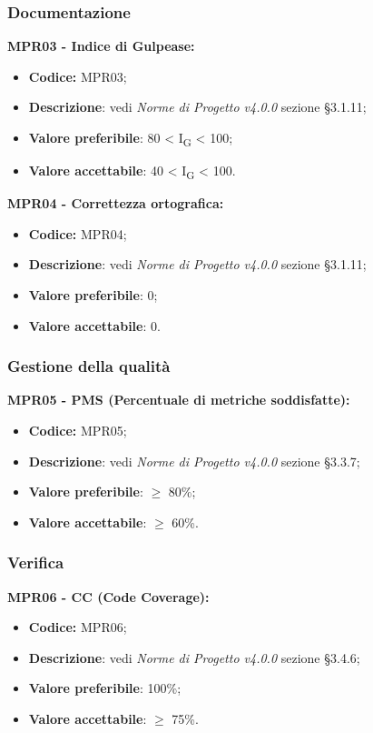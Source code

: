 \subsubsection{Documentazione}
\textbf{MPR03 - Indice di Gulpease:}
\begin{itemize}
    \item \textbf{Codice:} MPR03;
    \item \textbf{Descrizione}: vedi \textit{Norme di Progetto v4.0.0} sezione \S 3.1.11;
    \item \textbf{Valore preferibile}: 80 < I\textsubscript{G} < 100;
    \item \textbf{Valore accettabile}: 40 < I\textsubscript{G} < 100.
\end{itemize}
\textbf{MPR04 - Correttezza ortografica:}
\begin{itemize}
    \item \textbf{Codice:} MPR04;
    \item \textbf{Descrizione}: vedi \textit{Norme di Progetto v4.0.0} sezione \S 3.1.11;
    \item \textbf{Valore preferibile}: 0;
    \item \textbf{Valore accettabile}: 0.
\end{itemize}
\subsubsection{Gestione della qualità}
\textbf{MPR05 - PMS (Percentuale di metriche soddisfatte):}
\begin{itemize}
    \item \textbf{Codice:} MPR05;
    \item \textbf{Descrizione}: vedi \textit{Norme di Progetto v4.0.0} sezione \S 3.3.7;
    \item \textbf{Valore preferibile}: $\geq$ 80\%;
    \item \textbf{Valore accettabile}: $\geq$ 60\%.
\end{itemize}
\subsubsection{Verifica}
\textbf{MPR06 - CC (Code Coverage):}
\begin{itemize}
    \item \textbf{Codice:} MPR06;
    \item \textbf{Descrizione}: vedi \textit{Norme di Progetto v4.0.0} sezione \S 3.4.6;
    \item \textbf{Valore preferibile}: 100\%;
    \item \textbf{Valore accettabile}: $\geq$ 75\%.
\end{itemize}
